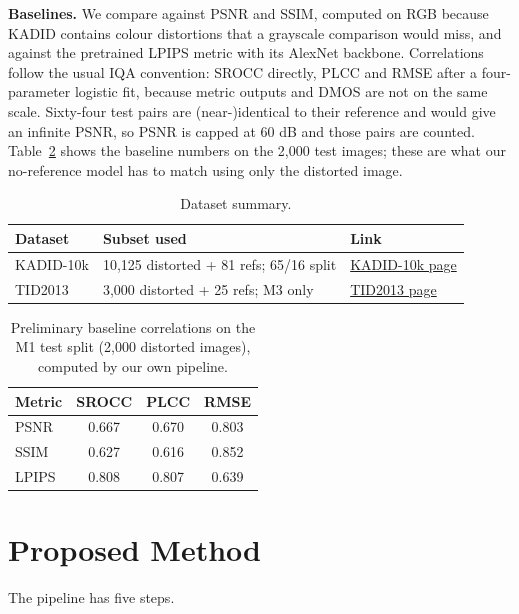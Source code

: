 \documentclass[11pt]{article}
\begin{document}
\textbf{Baselines.} We compare against PSNR and SSIM, computed on RGB because KADID
contains colour distortions that a grayscale comparison would miss, and against the
pretrained LPIPS metric \citep{zhang2018lpips} with its AlexNet backbone. Correlations
follow the usual IQA convention: SROCC directly, PLCC and RMSE after a four-parameter
logistic fit, because metric outputs and DMOS are not on the same scale. Sixty-four test
pairs are (near-)identical to their reference and would give an infinite PSNR, so PSNR is
capped at 60 dB and those pairs are counted. Table~\ref{tab:prelim} shows the baseline
numbers on the 2,000 test images; these are what our no-reference model has to match using
only the distorted image.

\begin{table}[h]
\centering
\caption{Dataset summary.}
\label{tab:data}
\begin{tabular}{@{}lll@{}}
\toprule
\textbf{Dataset} & \textbf{Subset used} & \textbf{Link} \\
\midrule
KADID-10k & 10,125 distorted + 81 refs; 65/16 split & \href{http://database.mmsp-kn.de/kadid-10k-database.html}{KADID-10k page} \\
TID2013 & 3,000 distorted + 25 refs; M3 only & \href{http://www.ponomarenko.info/tid2013.htm}{TID2013 page} \\
\bottomrule
\end{tabular}
\end{table}

\begin{table}[h]
\centering
\caption{Preliminary baseline correlations on the M1 test split (2,000 distorted
images), computed by our own pipeline.}
\label{tab:prelim}
\begin{tabular}{@{}lccc@{}}
\toprule
\textbf{Metric} & \textbf{SROCC} & \textbf{PLCC} & \textbf{RMSE} \\
\midrule
PSNR  & 0.667 & 0.670 & 0.803 \\
SSIM  & 0.627 & 0.616 & 0.852 \\
LPIPS \citep{zhang2018lpips} & 0.808 & 0.807 & 0.639 \\
\bottomrule
\end{tabular}
\end{table}

\section{Proposed Method}
\label{sec:method}
The pipeline has five steps.
\end{document}
